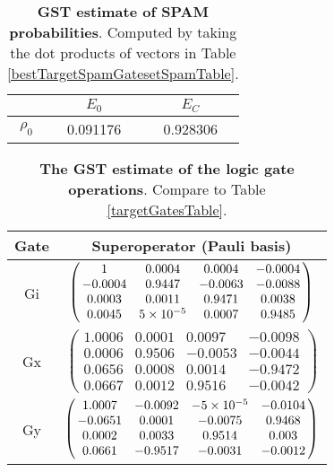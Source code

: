 {\begin{table}[h]
\begin{center}
\begin{tabular}[l]{|c|c|c|}
\hline
 & $E_{0}$ & $E_C$ \\ \hline
$\rho_{0}$ & 0.091176 & 0.928306 \\ \hline
\end{tabular}

\caption{\textbf{GST estimate of SPAM probabilities}.  Computed by taking the dot products of vectors in Table \ref{bestTargetSpamGatesetSpamTable}.\label{bestTargetSpamGatesetSpamParametersTable}}
\end{center}
\end{table}

\begin{table}[h]
\begin{center}
\begin{tabular}[l]{|c|c|}
\hline
Gate & Superoperator (Pauli basis) \\ \hline
Gi & $ \left(\!\!\begin{array}{cccc}
1 & 0.0004 & 0.0004 & -0.0004 \\ 
-0.0004 & 0.9447 & -0.0063 & -0.0088 \\ 
0.0003 & 0.0011 & 0.9471 & 0.0038 \\ 
0.0045 & 5\times 10^{-5} & 0.0007 & 0.9485
 \end{array}\!\!\right) $
 \\ \hline
Gx & $ \left(\!\!\begin{array}{cccc}
1.0006 & 0.0001 & 0.0097 & -0.0098 \\ 
0.0006 & 0.9506 & -0.0053 & -0.0044 \\ 
0.0656 & 0.0008 & 0.0014 & -0.9472 \\ 
0.0667 & 0.0012 & 0.9516 & -0.0042
 \end{array}\!\!\right) $
 \\ \hline
Gy & $ \left(\!\!\begin{array}{cccc}
1.0007 & -0.0092 & -5\times 10^{-5} & -0.0104 \\ 
-0.0651 & 0.0001 & -0.0075 & 0.9468 \\ 
0.0002 & 0.0033 & 0.9514 & 0.003 \\ 
0.0661 & -0.9517 & -0.0031 & -0.0012
 \end{array}\!\!\right) $
 \\ \hline
\end{tabular}

\caption{\textbf{The GST estimate of the logic gate operations}.  Compare to Table \ref{targetGatesTable}.\label{bestTargetSpamGatesetGatesTable}}
\end{center}
\end{table}

}
